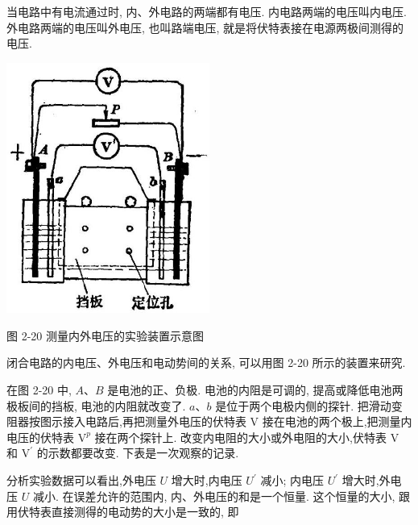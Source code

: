 \documentclass[10pt]{article}
\begin{document}
当电路中有电流通过时, 内、外电路的两端都有电压. 内电路两端的电压叫内电压. 外电路两端的电压叫外电压, 也叫路端电压, 就是将伏特表接在电源两极间测得的电压.

\begin{center}
\includegraphics[max width=0.5\textwidth]{images/01913056-1f15-74d8-9184-9aab52c9d66b_86_725135.jpg}
\end{center}

图 2-20 测量内外电压的实验装置示意图

闭合电路的内电压、外电压和电动势间的关系, 可以用图 2-20 所示的装置来研究.

在图 2-20 中, \(A\text{、}B\) 是电池的正、负极. 电池的内阻是可调的, 提高或降低电池两极板间的挡板, 电池的内阻就改变了. \(a\text{、}b\) 是位于两个电极内侧的探针. 把滑动变阻器按图示接入电路后,再把测量外电压的伏特表 \(\mathrm{V}\) 接在电池的两个极上,把测量内电压的伏特表 \({\mathrm{V}}^{p}\) 接在两个探针上. 改变内电阻的大小或外电阻的大小,伏特表 \(\mathrm{V}\) 和 \({\mathrm{V}}^{\prime }\) 的示数都要改变. 下表是一次观察的记录.

\begin{center}
\end{center}

分析实验数据可以看出,外电压 \(U\) 增大时,内电压 \({U}^{\prime }\) 减小; 内电压 \({U}^{\prime }\) 增大时,外电压 \(U\) 减小. 在误差允许的范围内, 内、外电压的和是一个恒量. 这个恒量的大小, 跟用伏特表直接测得的电动势的大小是一致的, 即
\end{document}
